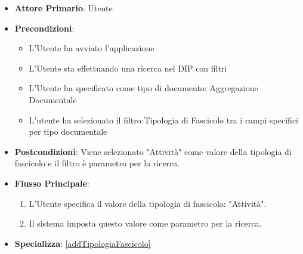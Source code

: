 \begin{itemize}
      \item \textbf{Attore Primario}: Utente
      \item \textbf{Precondizioni}: 
      \begin{itemize}            
            \item L'Utente ha avviato l'applicazione
            \item L'Utente sta effettuando una ricerca nel DIP con filtri
            \item L'Utente ha specificato come tipo di documento: Aggregazione Documentale
            \item L'utente ha selezionato il filtro Tipologia di Fascicolo tra i campi specifici per tipo documentale
      \end{itemize}
      \item \textbf{Postcondizioni}: Viene selezionato "Attività" come valore della tipologia di fascicolo e il filtro è parametro per la ricerca.
      \item \textbf{Flusso Principale}:
            \begin{enumerate}
                  \item L'Utente specifica il valore della tipologia di fascicolo: "Attività".
                  \item Il sistema imposta questo valore come parametro per la ricerca.
            \end{enumerate}
      \item \textbf{Specializza}: \ref{addTipologiaFascicolo}
\end{itemize}

